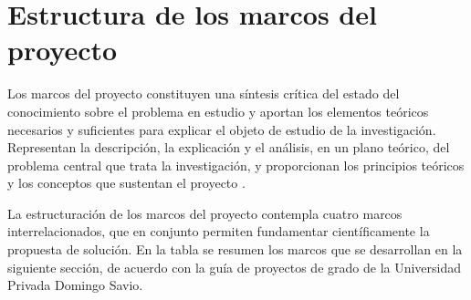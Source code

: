 
\section{Estructura de los marcos del proyecto}

Los marcos del proyecto constituyen una s\'intesis cr\'itica del estado del
conocimiento sobre el problema en estudio y aportan los elementos te\'oricos
necesarios y suficientes para explicar el objeto de estudio de la
investigaci\'on. Representan la descripci\'on, la explicaci\'on y el an\'alisis,
en un plano te\'orico, del problema central que trata la investigaci\'on, y
proporcionan los principios te\'oricos y los conceptos que sustentan el
proyecto \citep{arias2012, hernandez2014}.

La estructuraci\'on de los marcos del proyecto contempla cuatro marcos
interrelacionados, que en conjunto permiten fundamentar cient\'ificamente la
propuesta de soluci\'on. En la tabla se resumen los marcos que se desarrollan
en la siguiente secci\'on, de acuerdo con la gu\'ia de proyectos de grado de la
Universidad Privada Domingo Savio.

\begin{table}[H]
  \centering
  \caption{Estructura de los marcos del proyecto}
  \label{tab:estructura-marcos}
\end{table}


